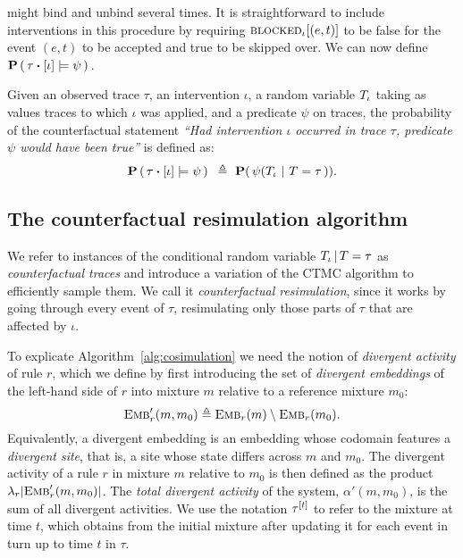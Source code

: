 might bind and unbind several times. It is straightforward to include
interventions in this procedure by requiring ${\textsc{blocked}}_{\iota}[(e, t)]$
to be false for the event $(e,t)$ to be accepted and true to be
skipped over. We can now define $\PCFST{}$.
\begin{definition}\label{def:counterfactuals}
  Given an observed trace $\tau$, an intervention $\iota$, a random
  variable ${T_\iota}{}$ taking as values traces to which $\iota$ was
  applied, and a predicate $\psi$ on traces, the probability of the
  counterfactual statement \textit{``Had intervention $\iota$ occurred
    in trace $\tau$, predicate $\psi$ would have been true''} is
  defined as:
  \[ \PCFST{} \ \eqdef \ \mathbf{P}(\, \psi(\ATRAJ{} \ |\ T =
    \tau\,)). \]
\end{definition}

\subsection{The counterfactual resimulation algorithm}

We refer to instances of the conditional random variable ${T_\iota\,|\,T=\tau}{}$ as
\emph{counterfactual traces} and introduce a variation of the CTMC
algorithm to efficiently sample them.  We call it \emph{counterfactual
  resimulation}, since it works by going through every event of
$\tau$, resimulating only those parts of $\tau$ that are affected by
$\iota$.



To explicate Algorithm~\ref{alg:cosimulation} we need the notion of
\emph{divergent activity} of rule $r$, which we define by first
introducing the set of \emph{divergent embeddings} of the left-hand
side of $r$ into mixture $m$ relative to a reference mixture $m_0$:
\[{\textsc{Emb}}'_{r}(m, m_0) \triangleq {\textsc{Emb}}_{r}(m) \setminus {\textsc{Emb}}_{r}(m_0).\]
Equivalently, a divergent embedding is an embedding whose codomain
features a \emph{divergent site}, that is, a site whose state differs
across $m$ and $m_0$. The {divergent activity} of a rule $r$ in
mixture $m$ relative to $m_0$ is then defined as the product
$\lambda_r|{\textsc{Emb}}'_{r}(m, m_0)|$. The \emph{total divergent activity} of
the system, $\alpha'(m, m_0)$, is the sum of all divergent
activities. We use the notation $\tau^{[t]}$ to refer to the
mixture at time $t$, which obtains from the initial mixture after
updating it for each event in turn up to time $t$ in $\tau$.

